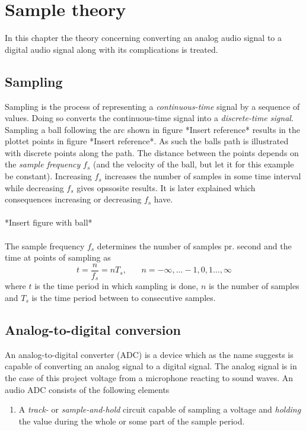 \chapter{Sample theory} \label{ch4}
In this chapter the theory concerning converting an analog audio signal to a digital audio signal along with its complications is treated.
\section{Sampling}
Sampling is the process of representing a \textit{continuous-time} signal by a sequence of values. Doing so converts the continuous-time signal into a \textit{discrete-time signal}. \cite{pelgrom} Sampling a ball following the arc shown in figure *Insert reference* results in the plottet points in figure *Insert reference*. As such the balls path is illustrated with discrete points along the path. The distance between the points depends on the \textit{sample frequency} $f_s$ (and the velocity of the ball, but let it for this example be constant). Increasing $f_s$ increases the number of samples in some time interval while decreasing $f_s$ gives opssosite results. It is later explained which consequences increasing or decreasing $f_s$ have.\\\\
*Insert figure with ball*\\\\
The sample frequency $f_s$ determines the number of samples pr. second and the time at points of sampling as
\begin{equation}
t=\frac{n}{f_s}=nT_s, \phantom{mm} n=-\infty,\hdots-1,0,1\hdots,\infty
\end{equation}
where $t$ is the time period in which sampling is done, $n$ is the number of samples and $T_s$ is the time period between to consecutive samples.
\section{Analog-to-digital conversion}\label{ADC}
An analog-to-digital converter (ADC) is a device which as the name suggests is capable of converting an analog signal to a digital signal. The analog signal is in the case of this project voltage from a microphone reacting to sound waves. An audio ADC consists of the following elements
\begin{enumerate}
\item A \textit{track-} or \textit{sample-and-hold} circuit capable of sampling a voltage and \textit{holding} the value during the whole or some part of the sample period.
\end{enumerate}
%


